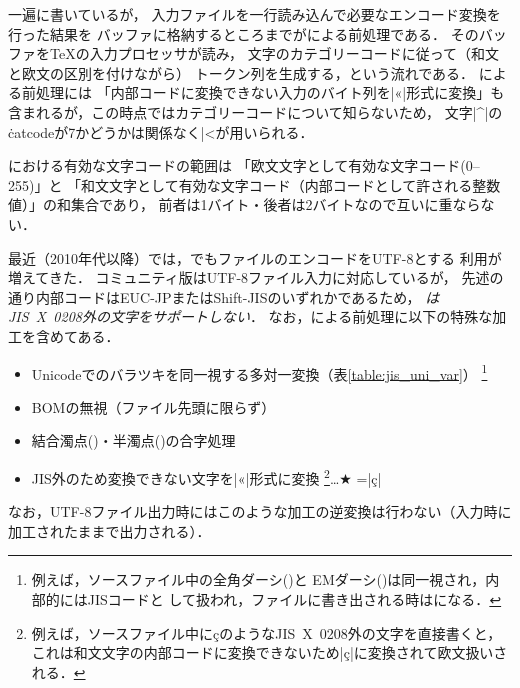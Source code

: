 \documentclass[a4paper,11pt,nomag,dvipdfmx]{jsarticle}
\begin{document}
\begin{dangerous}
一遍に書いているが，
入力ファイルを一行読み込んで必要なエンコード変換を行った結果を
バッファに格納するところまでがによる前処理である．
そのバッファを\TeX の入力プロセッサが読み，
文字のカテゴリーコードに従って（和文と欧文の区別を付けながら）
トークン列を生成する，という流れである．
による前処理には
「内部コードに変換できない入力のバイト列を|^^ab|形式に変換」も
含まれるが，この時点ではカテゴリーコードについて知らないため，
文字|^|の\.{catcode}が7かどうかは関係なく|^^|が用いられる．
\end{dangerous}

\pTeX における有効な文字コードの範囲は
「欧文文字として有効な文字コード(0--255)」と
「和文文字として有効な文字コード（内部コードとして許される整数値）」の和集合であり，
前者は1バイト・後者は2バイトなので互いに重ならない．

最近（2010年代以降）では，\pTeX でもファイルのエンコードをUTF-8とする
利用が増えてきた．
コミュニティ版\pTeX はUTF-8ファイル入力に対応しているが，
先述の通り内部コードはEUC-JPまたはShift-JISのいずれかであるため，
\emph{\pTeX はJIS~X~0208外の文字をサポートしない}．
なお，による前処理に以下の特殊な加工を含めてある．
\begin{itemize}
 \item Unicodeでのバラツキを同一視する多対一変換（表\ref{table:jis_uni_var}）
  \footnote{例えば，ソースファイル中の全角ダーシ()と
  EMダーシ()は同一視され，内部的にはJISコードと
  して扱われ，ファイルに書き出される時はになる．}
 \item BOMの無視（ファイル先頭に限らず）
 \item 結合濁点()・半濁点()の合字処理
 \item JIS外のため変換できない文字を|^^ab|形式に変換
  \footnote{例えば，ソースファイル中にçのようなJIS~X~0208外の文字を直接書くと，
  これは和文文字の内部コードに変換できないため|ç|に変換されて欧文扱いされる．}…★
  =\hbox{|ç|}\unless\ifdim\wd0>2em\ptErr{Check above: pLaTeX assumed}\fi
\end{itemize}
なお，UTF-8ファイル出力時にはこのような加工の逆変換は行わない（入力時に
加工されたままで出力される）．
\end{document}
